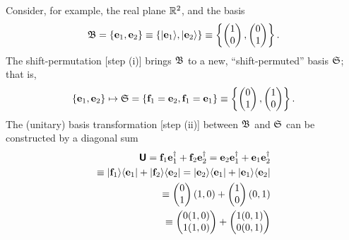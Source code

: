 {\color{blue}
\bexample
Consider, for example,
the real plane ${\Bbb R}^2$,
and the basis
$${\frak B}=\{ {\bf e}_1 , {\bf e}_2\} \equiv \{ \vert {\bf e}_1 \rangle , \vert {\bf e}_2\rangle \}
\equiv
\left\{\begin{pmatrix}1\\0\end{pmatrix},\begin{pmatrix}0\\1\end{pmatrix}\right\}.$$
The shift-permutation [step (i)] brings ${\frak B}$ to a new, ``shift-permuted'' basis  ${\frak S}$; that is,
$$\{ {\bf e}_1 , {\bf e}_2\} \mapsto {\frak S}= \{ {\bf f}_1={\bf e}_2,{\bf f}_1={\bf e}_1 \} \equiv \left\{\begin{pmatrix}0\\1\end{pmatrix},\begin{pmatrix}1\\0\end{pmatrix}\right\}.$$
The (unitary) basis transformation [step (ii)] between $ {\frak B} $ and
$  {\frak S}$ can be constructed by a diagonal sum
\begin{equation}
\begin{split}
\textsf{\textbf{U}} ={\bf f}_1  {\bf e}_1^\dagger+ {\bf f}_2  {\bf e}_2^\dagger = {\bf e}_2   {\bf e}_1^\dagger+ {\bf e}_1  {\bf e}_2^\dagger   \\
\equiv \vert {\bf f}_1\rangle \langle {\bf  e}_1\vert + \vert {\bf f}_2\rangle \langle   {\bf e}_2 \vert = \vert {\bf e}_2\rangle \langle    {\bf e}_1\vert + \vert {\bf e}_1\rangle \langle   {\bf e}_2    \vert         \\
\equiv
\begin{pmatrix}
0 \\
1
\end{pmatrix}
(1,0)+
\begin{pmatrix}
1 \\
0
\end{pmatrix}
(0,1)  \\
\qquad \equiv
\begin{pmatrix}
0 (1,0)\\
1 (1,0)
\end{pmatrix}
+
\begin{pmatrix}
1 (0,1)\\
0 (0,1)
\end{pmatrix}
   \\

\end{split}
\end{equation}}
